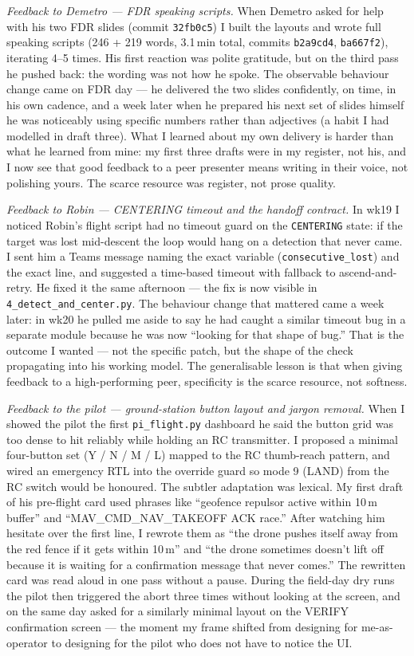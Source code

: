 \textit{Feedback to Demetro --- FDR speaking scripts.} When Demetro asked for help with his two FDR slides (commit \texttt{32fb0c5}) I built the layouts and wrote full speaking scripts (246 + 219 words, 3.1\,min total, commits \texttt{b2a9cd4}, \texttt{ba667f2}), iterating 4--5 times. His first reaction was polite gratitude, but on the third pass he pushed back: the wording was not how he spoke. The observable behaviour change came on FDR day --- he delivered the two slides confidently, on time, in his own cadence, and a week later when he prepared his next set of slides himself he was noticeably using specific numbers rather than adjectives (a habit I had modelled in draft three). What I learned about my own delivery is harder than what he learned from mine: my first three drafts were in my register, not his, and I now see that good feedback to a peer presenter means writing in their voice, not polishing yours. The scarce resource was register, not prose quality.

\textit{Feedback to Robin --- CENTERING timeout and the handoff contract.} In wk19 I noticed Robin's flight script had no timeout guard on the \texttt{CENTERING} state: if the target was lost mid-descent the loop would hang on a detection that never came. I sent him a Teams message naming the exact variable (\texttt{consecutive\_lost}) and the exact line, and suggested a time-based timeout with fallback to ascend-and-retry. He fixed it the same afternoon --- the fix is now visible in \texttt{4\_detect\_and\_center.py}. The behaviour change that mattered came a week later: in wk20 he pulled me aside to say he had caught a similar timeout bug in a separate module because he was now ``looking for that shape of bug.'' That is the outcome I wanted --- not the specific patch, but the shape of the check propagating into his working model. The generalisable lesson is that when giving feedback to a high-performing peer, specificity is the scarce resource, not softness.

\textit{Feedback to the pilot --- ground-station button layout and jargon removal.} When I showed the pilot the first \texttt{pi\_flight.py} dashboard he said the button grid was too dense to hit reliably while holding an RC transmitter. I proposed a minimal four-button set (Y / N / M / L) mapped to the RC thumb-reach pattern, and wired an emergency RTL into the override guard so mode 9 (LAND) from the RC switch would be honoured. The subtler adaptation was lexical. My first draft of his pre-flight card used phrases like ``geofence repulsor active within 10\,m buffer'' and ``MAV\_CMD\_NAV\_TAKEOFF ACK race.'' After watching him hesitate over the first line, I rewrote them as ``the drone pushes itself away from the red fence if it gets within 10\,m'' and ``the drone sometimes doesn't lift off because it is waiting for a confirmation message that never comes.'' The rewritten card was read aloud in one pass without a pause. During the field-day dry runs the pilot then triggered the abort three times without looking at the screen, and on the same day asked for a similarly minimal layout on the VERIFY confirmation screen --- the moment my frame shifted from designing for me-as-operator to designing for the pilot who does not have to notice the UI.

